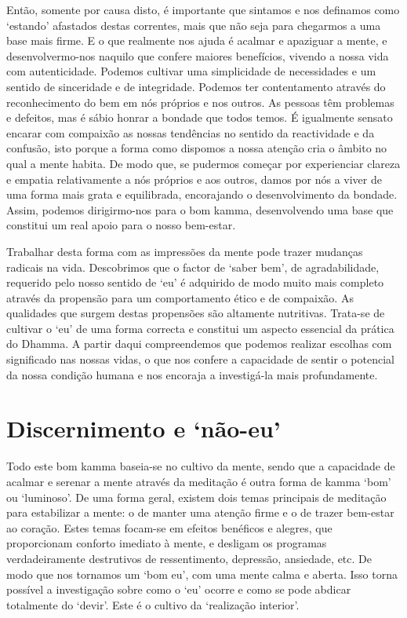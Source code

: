 Então, somente por causa disto, é importante que sintamos e nos definamos como
`estando' afastados destas correntes, mais que não seja para chegarmos a uma
base mais firme. E o que realmente nos ajuda é acalmar e apaziguar a mente, e
desenvolvermo-nos naquilo que confere maiores benefícios, vivendo a nossa vida
com autenticidade. Podemos cultivar uma simplicidade de necessidades e um
sentido de sinceridade e de integridade. Podemos ter contentamento através do
reconhecimento do bem em nós próprios e nos outros. As pessoas têm problemas e
defeitos, mas é sábio honrar a bondade que todos temos. É igualmente sensato
encarar com compaixão as nossas tendências no sentido da reactividade e da
confusão, isto porque a forma como dispomos a nossa atenção cria o âmbito no
qual a mente habita. De modo que, se pudermos começar por experienciar clareza e
empatia relativamente a nós próprios e aos outros, damos por nós a viver de uma
forma mais grata e equilibrada, encorajando o desenvolvimento da bondade. Assim,
podemos dirigirmo-nos para o bom kamma, desenvolvendo uma base que constitui um
real apoio para o nosso bem-estar.

Trabalhar desta forma com as impressões da mente pode trazer mudanças radicais
na vida. Descobrimos que o factor de `saber bem', de agradabilidade, requerido
pelo nosso sentido de `eu' é adquirido de modo muito mais completo através da
propensão para um comportamento ético e de compaixão. As qualidades que surgem
destas propensões são altamente nutritivas. Trata-se de cultivar o `eu' de uma
forma correcta e constitui um aspecto essencial da prática do Dhamma. A partir
daqui compreendemos que podemos realizar escolhas com significado nas nossas
vidas, o que nos confere a capacidade de sentir o potencial da nossa condição
humana e nos encoraja a investigá-la mais profundamente.

\section{Discernimento e `não-eu\kern -0.5pt'}

Todo este bom kamma baseia-se no cultivo da mente, sendo que a capacidade de
acalmar e serenar a mente através da meditação é outra forma de kamma `bom' ou
`luminoso'. De uma forma geral, existem dois temas principais de meditação para
estabilizar a mente: o de manter uma atenção firme e o de trazer bem-estar ao
coração. Estes temas focam-se em efeitos benéficos e alegres, que proporcionam
conforto imediato à mente, e desligam os programas verdadeiramente destrutivos
de ressentimento, depressão, ansiedade, etc. De modo que nos tornamos um `bom
eu', com uma mente calma e aberta. Isso torna possível a investigação sobre como
o `eu' ocorre e como se pode abdicar totalmente do `devir'. Este é o cultivo da
`realização interior'.

